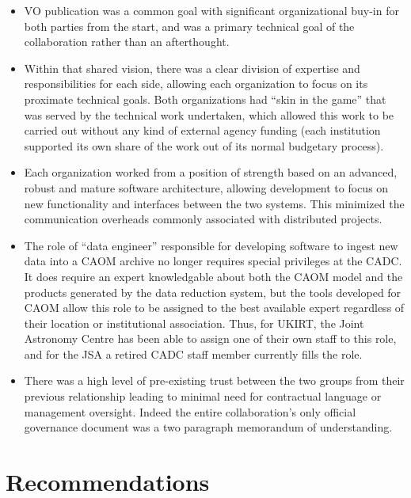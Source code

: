 \documentclass[final,authoryear,5p,times,twocolumn]{elsarticle}
\begin{document}
\begin{itemize}
\item VO publication was a common goal with significant organizational
  buy-in for both parties from the start, and was a primary technical
  goal of the collaboration rather than an afterthought.

\item Within that shared vision, there was a clear division of
  expertise and responsibilities for each side, allowing each
  organization to focus on its proximate technical goals. Both
  organizations had ``skin in the game'' that was served by the
  technical work undertaken, which allowed this work to be carried out
  without any kind of external agency funding (each institution
  supported its own share of the work out of its normal budgetary
  process).

\item Each organization worked from a position of strength based on an
  advanced, robust and mature software architecture, allowing
  development to focus on new functionality and interfaces between the
  two systems. This minimized the communication overheads commonly
  associated with distributed projects.

\item The role of ``data engineer'' responsible for developing software to
ingest new data into a CAOM archive no longer requires special privileges
at the CADC.  It does require an expert
knowledgable about both the CAOM model and the products generated
by the data reduction system, but the tools developed for CAOM
allow this role to be assigned to the best available expert regardless of their
location or institutional association.  Thus, for UKIRT, the Joint Astronomy Centre has been able to
assign one of their own staff to this role, and for the JSA a retired CADC staff
member currently fills the role.

\item There was a high level of pre-existing trust between the two
  groups from their previous relationship leading to minimal need for
  contractual language or management oversight. Indeed the entire
  collaboration's only official governance document was a two paragraph
  memorandum of understanding.
\end{itemize}

\section{Recommendations}
\end{document}
